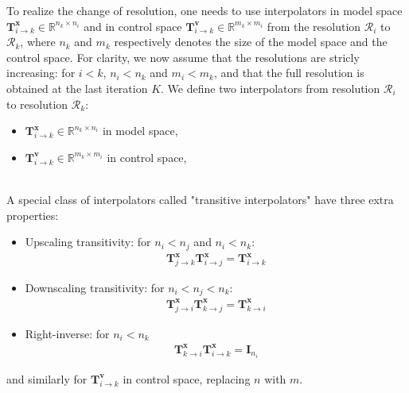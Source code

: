 \documentclass[npg, manuscript]{copernicus}
\begin{document}
To realize the change of resolution, one needs to use interpolators in model space $\mathbf{T}^\mathbf{x}_{i \rightarrow k} \in \mathbb{R}^{n_k \times n_i}$ and in control space $\mathbf{T}^\mathbf{v}_{i \rightarrow k} \in \mathbb{R}^{m_k \times m_i}$ from the resolution $\mathcal{R}_i$ to $\mathcal{R}_k$, where $n_k$ and $m_k$ respectively denotes the size of the model space and the control space.
For clarity, we now assume that the resolutions are stricly increasing: for $i < k$, $n_i < n_k$ and $m_i < m_k$, and that the full resolution is obtained at the last iteration $K$. We define two interpolators from resolution $\mathcal{R}_i$ to resolution $\mathcal{R}_k$:
\begin{itemize}
\item $\mathbf{T}^\mathbf{x}_{i \rightarrow k} \in \mathbb{R}^{n_k \times n_i}$ in model space,
\item $\mathbf{T}^\mathbf{v}_{i \rightarrow k} \in \mathbb{R}^{m_k \times m_i}$ in control space,
\end{itemize}
$  $\\
A special class of interpolators called "transitive interpolators" have three extra properties:
\begin{itemize}
\item Upscaling transitivity: for $n_i < n_j$ and $n_i < n_k$:
\begin{align}
\mathbf{T}^\mathbf{x}_{j \rightarrow k} \mathbf{T}^\mathbf{x}_{i \rightarrow j} = \mathbf{T}^\mathbf{x}_{i \rightarrow k}
\end{align}
\item Downscaling transitivity: for $n_i < n_j < n_k$:
\begin{align}
\mathbf{T}^\mathbf{x}_{j \rightarrow i} \mathbf{T}^\mathbf{x}_{k \rightarrow j} = \mathbf{T}^\mathbf{x}_{k \rightarrow i}
\end{align}
\item Right-inverse: for $n_i < n_k$
\begin{align}
\mathbf{T}^\mathbf{x}_{k \rightarrow i} \mathbf{T}^\mathbf{x}_{i \rightarrow k} = \mathbf{I}_{n_i}
\end{align}
\end{itemize}
and similarly for $\mathbf{T}^\mathbf{v}_{i \rightarrow k}$ in control space, replacing $n$ with $m$.
\end{document}
